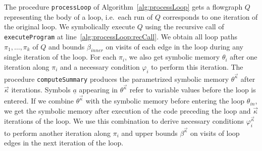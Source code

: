 \documentclass[10pt,a4paper]{article}
\newcommand{\var}[1]{\texttt{#1}}
\newcommand{\sym}[1]{\ensuremath{\underline{#1}}}
\newcommand{\maxim}{\ensuremath{\mathbf{max}}}
\newcommand{\minim}{\ensuremath{\mathbf{min}}}
\newcommand{\aset}{\ensuremath{\longleftarrow}}
\begin{document}

The procedure \texttt{processLoop} of Algorithm~\ref{alg:processLoop} gets a
flowgraph $Q$ representing the body of a loop, i.e.~each run of $Q$
corresponds to one iteration of the original loop. We symbolically execute
$Q$ using the recursive call of \texttt{executeProgram} at
line~\ref{alg:processLoop:recCall}. We obtain all loop paths
$\pi_1,\ldots,\pi_k$ of $Q$ and bounds $\beta_\mathit{inner}$ on visits
of each edge in the loop during any single iteration of the loop. For each
$\pi_i$, we also get symbolic memory $\theta_i$ after one iteration along
$\pi_i$ and a necessary condition $\varphi_i$ to perform this iteration.
The procedure \texttt{computeSummary} produces the parametrized symbolic
memory $\theta^{\vec{\kappa}}$ after
$\vec{\kappa}$ iterations.
Symbols $\sym{a}$ appearing in $\theta^{\vec{\kappa}}$ refer to variable
values before the loop is entered. If we combine $\theta^{\vec{\kappa}}$
with the symbolic memory before entering the loop $\theta_\mathit{in}$, we
get the symbolic memory after execution of the code preceding the loop and
$\vec{\kappa}$ iterations of the loop. We use this combination to derive
necessary conditions $\varphi_i^{\vec{\kappa}}$ to perform another iteration
along $\pi_i$ and upper bounds $\beta^{\vec{\kappa}}$ on visits of loop
edges in the next iteration of the loop. 
\end{document}
